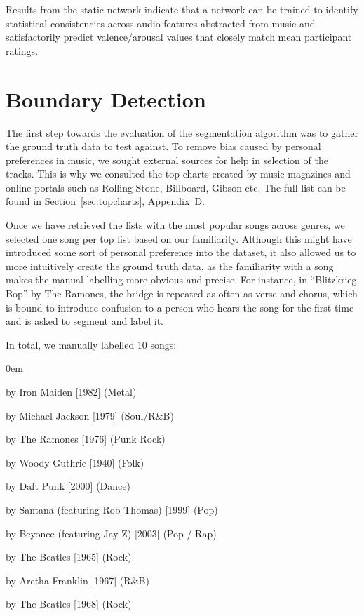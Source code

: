 Results from the static network indicate that a network can be trained to identify statistical consistencies across audio features abstracted from music and satisfactorily predict valence/arousal values that closely match mean participant ratings.


\vspace{20pt}
\newpage

\section{Boundary Detection}

The first step towards the evaluation of the segmentation algorithm was to gather the ground truth data to test against. To remove bias caused by personal preferences in music, we sought external sources for help in selection of the tracks. This is why we consulted the top charts created by music magazines and online portals such as Rolling Stone, Billboard, Gibson etc. The full list can be found in Section~\ref{sec:topcharts}, Appendix~D.

Once we have retrieved the lists with the most popular songs across genres, we selected one song per top list based on our familiarity. Although this might have introduced some sort of personal preference into the dataset, it also allowed us to more intuitively create the ground truth data, as the familiarity with a song makes the manual labelling more obvious and precise. For instance, in ``Blitzkrieg Bop'' by The Ramones, the bridge is repeated as often as verse and chorus, which is bound to introduce confusion to a person who hears the song for the first time and is asked to segment and label it.

In total, we manually labelled 10 songs:
\vspace{-10pt}
\begin{description}
\itemsep0em 
\item[``The Number of The Beast''] by Iron Maiden [1982] (Metal)
\item[``Rock With You''] by Michael Jackson [1979] (Soul/R\&B)
\item[``Blitzkrieg Bop''] by The Ramones [1976] (Punk Rock)
\item[``This Land is Your Land''] by Woody Guthrie [1940] (Folk)
\item[``One More Time''] by Daft Punk [2000] (Dance)
\item[``Smooth''] by Santana (featuring Rob Thomas) [1999] (Pop)
\item[``Crazy in Love''] by Beyonce (featuring Jay-Z) [2003] (Pop / Rap)
\item[``Help!''] by The Beatles [1965] (Rock)
\item[``Respect''] by Aretha Franklin [1967] (R\&B)
\item[``Back in the U.S.S.R.''] by The Beatles [1968] (Rock)
\end{description}


